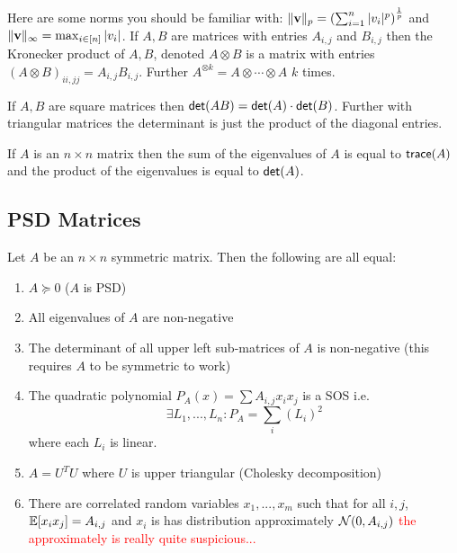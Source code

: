 Here are some norms you should be familiar with: $\norm{\mathbf{v}}_p = \left(\sum_{i=1}^{n}|v_i|^p\right)^{\frac{1}{p}}$ and $\norm{\mathbf{v}}_{\infty} = \max_{i \in [n]}|v_i|$. If $A, B$ are matrices with entries $A_{i,j}$ and $B_{i,j}$ then the Kronecker product of $A, B$, denoted $A \otimes B$ is a matrix with entries $(A \otimes B)_{ii,jj} = A_{i,j}B_{i,j}$. Further $A^{\otimes k} = A \otimes \cdots \otimes A$ $k$ times. 

If $A, B$ are square matrices then $\mathsf{det}(AB) = \mathsf{det}(A)\cdot\mathsf{det}(B)$. Further with triangular matrices the determinant is just the product of the diagonal entries.

\begin{theorem}
If $A$ is an $n\times n$ matrix then the sum of the eigenvalues of $A$ is equal to $\mathsf{trace}(A)$ and the product of the eigenvalues is equal to $\mathsf{det}(A)$.
\end{theorem}

\subsection{PSD Matrices}
\begin{theorem}
Let $A$ be an $n \times n$ symmetric matrix. Then the following are all equal:
\begin{enumerate}
\item $A \succeq 0$ ($A$ is PSD)
\item All eigenvalues of $A$ are non-negative
\item The determinant of all upper left sub-matrices of $A$ is non-negative (this requires $A$ to be symmetric to work)
\item The quadratic polynomial $P_{A}(x) = \sum A_{i,j}x_ix_j$ is a SOS i.e.
\[\exists L_1, ..., L_n: P_{A} = \sum_{i}(L_i)^2\]
where each $L_i$ is linear.
\item $A = U^TU$ where $U$ is upper triangular (Cholesky decomposition)  
\item There are correlated random variables $x_1, ..., x_m$ such that for all $i, j$, $\mathbb{E}[x_ix_j] = A_{i,j}$ and $x_i$ is has distribution approximately $\mathcal{N}(0,A_{i,j})$ \textcolor{red}{the approximately is really quite suspicious...}
\end{enumerate}
\end{theorem}

